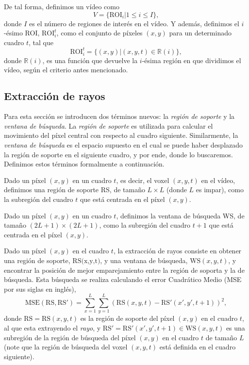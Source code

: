 	De tal forma, definimos un vídeo como 
	\begin{equation}\label{algoritmo:eq:video}		
		V = \{\text{ROI}_i | 1 \leq i \le I\}, 
	\end{equation}
	donde $I$ es el número de regiones de interés en el vídeo. Y además, definimos el $i$-ésimo ROI, $\text{ROI}_i^t$, como el conjunto de píxeles $(x,y)$ para un determinado cuadro $t$, tal que
	\begin{equation}\label{algoritmo:eq:roi}
		\text{ROI}_{i}^{t} = \{(x,y) | (x,y,t) \in \mathds{R}(i)\},
	\end{equation}
	donde $\mathds{R}(i)$, es una función que devuelve la $i$-ésima región en que dividimos el vídeo, según el criterio antes mencionado.

	\subsection{Extracción de rayos}
	\label{algoritmo:ext_rayos}
	
	Para esta sección se introducen dos términos nuevos: la \emph{región de soporte} y la \emph{ventana de búsqueda}. La \emph{región de soporte} es utilizada para calcular el movimiento del píxel central con respecto al cuadro siguiente. Similarmente, la \emph{ventana de búsqueda} es el espacio supuesto en el cual se puede haber desplazado la región de soporte en el siguiente cuadro, y por ende, donde lo buscaremos. Definimos estos términos formalmente a continuación.
	
	\begin{definition}	
  Dado un píxel $(x,y)$ en un cuadro $t$, es decir, el voxel $(x,y,t)$ en el vídeo, definimos una región de soporte RS, de tamaño $L \times L$ (donde $L$ es impar), como la subregión del cuadro $t$ que está centrada en el píxel $(x,y)$.
	\end{definition}

	\begin{definition}
	Dado un píxel $(x,y)$ en un cuadro $t$, definimos la ventana de búsqueda WS, de  tamaño $(2L+1) \times (2L+1)$, como la subregión del cuadro $t+1$ que está centrada en el píxel $(x,y)$.
	\end{definition}
		
	Dado un píxel $(x,y)$ en el cuadro $t$, la extracción de rayos consiste en obtener una región de soporte, $\text{RS(x,y,t)}$, y una ventana de búsqueda, $\text{WS}(x,y,t)$, y encontrar la posición de mejor emparejamiento entre la región de soporta y la de búsqueda. Esta búsqueda se realiza calculando el error Cuadrático Medio (MSE por sus siglas en inglés), \begin{equation}\label{algoritmo:eq:mse}	
			\text{MSE}(\text{RS}, \text{RS}') = \sum_{x=1}^{L} \sum_{y=1}^{L} (\text{RS}(x,y,t) - \text{RS}'(x',y',t+1))^2,
		\end{equation} 
	donde $\text{RS} = \text{RS}(x,y,t)$ es la región de soporte del píxel $(x,y)$ en el cuadro $t$, al que esta extrayendo el \textit{rayo}, y $\text{RS}' = \text{RS}'(x',y',t+1) \in \text{WS}(x,y,t)$ es una subregión de la región de búsqueda del píxel $(x,y)$ en el cuadro $t$ de tamaño $L$ (note que la región de búsqueda del voxel $(x,y,t)$ está definida en el cuadro siguiente).
		
